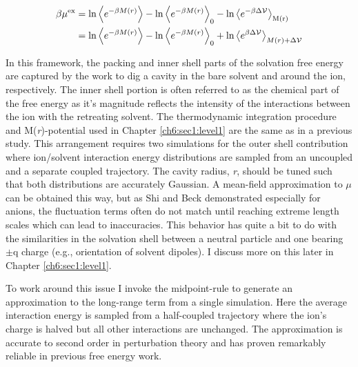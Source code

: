 \begin{theory}
  \begin{equation}
   \begin{aligned}
    \beta\mu^{\mathrm{ex}} &= \mathrm{ln}\left<e^{-\beta M(r)}\right> - \mathrm{ln}\left<e^{-\beta M(r)}\right>_{\mathrm{0}} - 
                        \mathrm{ln}\left<e^{-\beta\Delta\mathcal{V}}\right>_{\mathrm{M(r)}} \\
                     &= \mathrm{ln}\left<e^{-\beta M(r)}\right> - \mathrm{ln}\left<e^{-\beta M(r)}\right>_{\mathrm{0}} +
                        \mathrm{ln}\left<e^{\beta\Delta\mathcal{V}}\right>_{M(r)+\Delta\mathcal{V}}
    \label{eqn:scqct}
   \end{aligned}
  \end{equation}  
  
  In this framework, the packing and inner shell parts of the solvation free energy are captured by the work to dig
  a cavity in the bare solvent and around the ion, respectively. The inner shell portion is often referred to as the
  chemical part of the free energy as it's magnitude reflects the intensity of the interactions between the ion with 
  the retreating solvent. The thermodynamic integration procedure and M(\emph{r})-potential used in Chapter 
  \ref{ch6:sec1:level1} are the same as in a previous study\cite{shi2013length}. This arrangement requires two simulations
  for the outer shell contribution where ion/solvent interaction energy distributions are sampled from an uncoupled 
  and a separate coupled trajectory. The cavity radius, \emph{r}, should be tuned such that both distributions are
  accurately Gaussian. A mean-field approximation to $\mu$ can be obtained this 
  way\cite{hummer1996, hummer1998}, but as Shi and Beck demonstrated especially for anions, the fluctuation terms often
  do not match until reaching extreme length scales which can lead to inaccuracies\cite{shi2013length}. This behavior 
  has quite a bit to do with the similarities in the solvation shell between a neutral particle and one bearing 
  $\pm$q charge (e.g., orientation of solvent dipoles). I discuss more on this later in Chapter \ref{ch6:sec1:level1}.

  To work around this issue I invoke the midpoint-rule to generate an approximation to the long-range term from a 
  single simulation. Here the average interaction energy is sampled from a half-coupled trajectory where the ion's 
  charge is halved but all other interactions are unchanged. The approximation is accurate to second order in 
  perturbation theory and has proven remarkably reliable in previous free energy work\cite{beck2011lmft, shi2013length}.

\end{theory}
